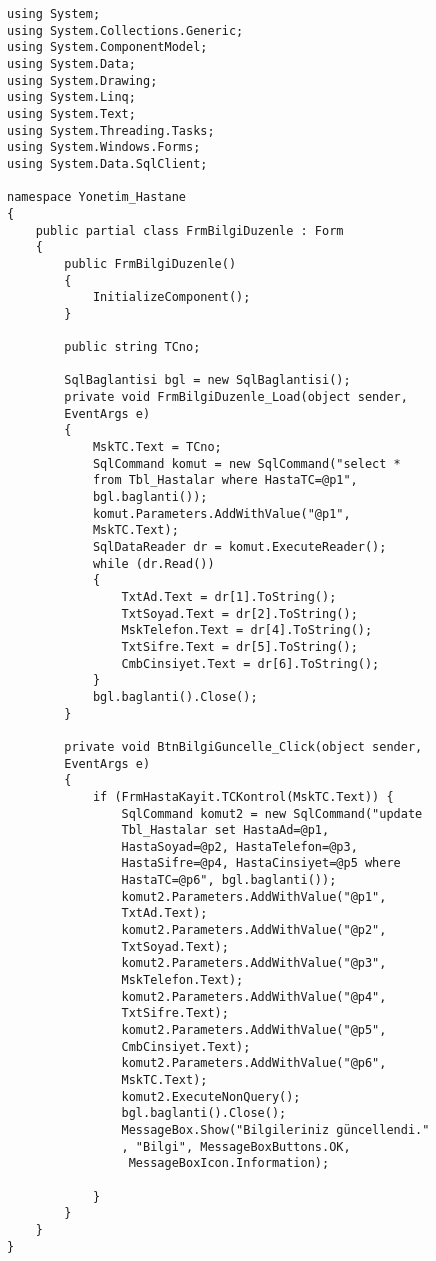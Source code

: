 \begin{lstlisting}
using System;
using System.Collections.Generic;
using System.ComponentModel;
using System.Data;
using System.Drawing;
using System.Linq;
using System.Text;
using System.Threading.Tasks;
using System.Windows.Forms;
using System.Data.SqlClient;

namespace Yonetim_Hastane
{
    public partial class FrmBilgiDuzenle : Form
    {
        public FrmBilgiDuzenle()
        {
            InitializeComponent();
        }

        public string TCno;

        SqlBaglantisi bgl = new SqlBaglantisi();
        private void FrmBilgiDuzenle_Load(object sender, 
        EventArgs e)
        {
            MskTC.Text = TCno;
            SqlCommand komut = new SqlCommand("select * 
            from Tbl_Hastalar where HastaTC=@p1", 
            bgl.baglanti());
            komut.Parameters.AddWithValue("@p1", 
            MskTC.Text);
            SqlDataReader dr = komut.ExecuteReader();
            while (dr.Read())
            {
                TxtAd.Text = dr[1].ToString();
                TxtSoyad.Text = dr[2].ToString();
                MskTelefon.Text = dr[4].ToString();
                TxtSifre.Text = dr[5].ToString();
                CmbCinsiyet.Text = dr[6].ToString();
            }
            bgl.baglanti().Close();
        }

        private void BtnBilgiGuncelle_Click(object sender, 
        EventArgs e)
        {
            if (FrmHastaKayit.TCKontrol(MskTC.Text)) {
                SqlCommand komut2 = new SqlCommand("update 
                Tbl_Hastalar set HastaAd=@p1, 
                HastaSoyad=@p2, HastaTelefon=@p3, 
                HastaSifre=@p4, HastaCinsiyet=@p5 where 
                HastaTC=@p6", bgl.baglanti());
                komut2.Parameters.AddWithValue("@p1", 
                TxtAd.Text);
                komut2.Parameters.AddWithValue("@p2", 
                TxtSoyad.Text);
                komut2.Parameters.AddWithValue("@p3", 
                MskTelefon.Text);
                komut2.Parameters.AddWithValue("@p4", 
                TxtSifre.Text);
                komut2.Parameters.AddWithValue("@p5", 
                CmbCinsiyet.Text);
                komut2.Parameters.AddWithValue("@p6", 
                MskTC.Text);
                komut2.ExecuteNonQuery();
                bgl.baglanti().Close();
                MessageBox.Show("Bilgileriniz güncellendi."
                , "Bilgi", MessageBoxButtons.OK,
                 MessageBoxIcon.Information);

            }
        }
    }
}
\end{lstlisting}

